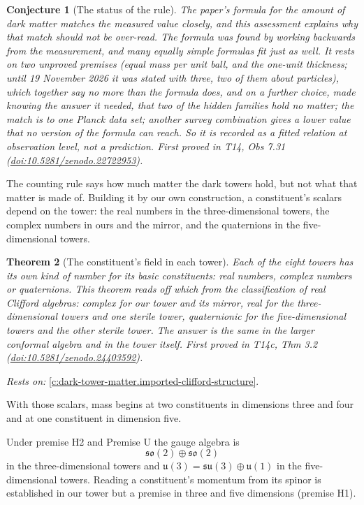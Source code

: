 \documentclass[11pt]{article}
\newtheorem{theorem}{Theorem}[section]
\newtheorem{conjecture}[theorem]{Conjecture}
\theoremstyle{definition}
\theoremstyle{plain}
\providecommand{\so}{}\renewcommand{\so}{\mathfrak{so}}
\providecommand{\su}{}\renewcommand{\su}{\mathfrak{su}}
\providecommand{\uu}{}\renewcommand{\uu}{\mathfrak{u}}
\begin{document}
\begin{conjecture}[The status of the rule]\label{c:dark-matter.status-rule}
The paper's formula for the amount of dark matter matches the measured value closely, and this assessment explains why that match should not be over-read. The formula was found by working backwards from the measurement, and many equally simple formulas fit just as well. It rests on two unproved premises (equal mass per unit ball, and the one-unit thickness; until 19 November 2026 it was stated with three, two of them about particles), which together say no more than the formula does, and on a further choice, made knowing the answer it needed, that two of the hidden families hold no matter; the match is to one Planck data set; another survey combination gives a lower value that no version of the formula can reach. So it is recorded as a fitted relation at observation level, not a prediction.
\emph{First proved in} T14, Obs 7.31 (\href{https://doi.org/10.5281/zenodo.22722953}{doi:10.5281/zenodo.22722953}).
\end{conjecture}

The counting rule says how much matter the dark towers hold, but not what that matter is made of. Building it by our own construction, a constituent's scalars depend on the tower: the real numbers in the three-dimensional towers, the complex numbers in ours and the mirror, and the quaternions in the five-dimensional towers.

\begin{theorem}[The constituent's field in each tower]\label{c:dark-tower-matter.constituents-field}
Each of the eight towers has its own kind of number for its basic constituents: real numbers, complex numbers or quaternions. This theorem reads off which from the classification of real Clifford algebras: complex for our tower and its mirror, real for the three-dimensional towers and one sterile tower, quaternionic for the five-dimensional towers and the other sterile tower. The answer is the same in the larger conformal algebra and in the tower itself.
\emph{First proved in} T14c, Thm 3.2 (\href{https://doi.org/10.5281/zenodo.24403592}{doi:10.5281/zenodo.24403592}).
\end{theorem}
\noindent\emph{Rests on:} \ref{c:dark-tower-matter.imported-clifford-structure}.

With those scalars, mass begins at two constituents in dimensions three and four and at one constituent in dimension five.

Under premise H2 and Premise U the gauge algebra is \[ \so(2) \oplus \so(2) \] in the three-dimensional towers and $\uu(3) = \su(3) \oplus \uu(1)$ in the five-dimensional towers. Reading a constituent's momentum from its spinor is established in our tower but a premise in three and five dimensions (premise H1).
\end{document}
